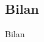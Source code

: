 \documentclass[9pt]{beamer}
\begin{document}
\subsection{Bilan}
\begin{frame}{Bilan}
\end{frame}











\begin{comment}


\begin{frame}{INTRODUCTION}
	Your text with scientific results or what ever... Your text with
scientific results or what ever... Your text with scientific results or
what ever... Your text with scientific results or what ever... Your
text with scientific results or what ever... Your text with scientific
results or what ever... Your text with scientific results or what
ever... Your text with scientific results or what ever... Your text
with scientific results or what ever...

Your text with scientific results or what ever... Your text with
scientific results or what ever... Your text with scientific results or
what ever... Your text with scientific results or what ever... Your
text with scientific results or what ever... Your text with scientific
results or what ever... Your text with scientific results or what
ever...
\end{frame}


\begin{frame}{Titre de la page}
Texte courant dunt am iriure commolut eumsandio odolor sectem
nonsed tinim nis nisl utem dion hent amcorer in vendio.

\begin{itemize}
\item Ugait delis aliquip sustie delit, secte velent aliquam, quisl ulla
  doloreet dolesed euguercip esent illa feugiam vent non henim.
\item To consed te dolesed uationsequat nonsed ex ea core dolore
velismo lendrer aesenim ea adiat.
\item Riurero conse modolorper se doloreetuero esequip.
  \begin{itemize}
  \item El iniamcom ea faccum nulputpat,
  \item Sequis adipism odolore dolent prat volore faccum venit,
  \item Consecte volorem inciliq uipsum et am accummo,
  \item Nummy nostin hent utpate ex.
  \end{itemize}
\end{itemize}
\end{frame}


\end{comment}
\end{document}
